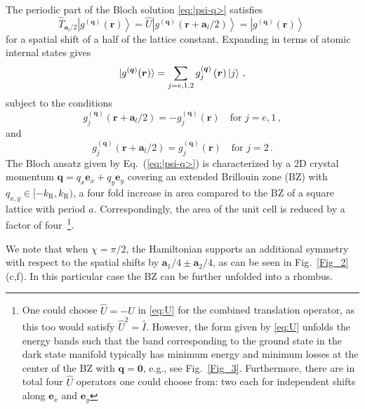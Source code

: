 \documentclass[aps,pra,twocolumn,showpacs,superscriptaddress,floatfix,longbibliography]{revtex4-1}
\def\kr{k_{\mathrm R}}                            			%
\def\ex{\boldsymbol{e}_x}
\def\ey{\boldsymbol{e}_y}
\begin{document}
The periodic part of the Bloch solution \eqref{eq:|psi-q>} satisfies
%
\begin{equation}
\hat{T}_{\mathbf{a}_l /2} \left|g^{(\boldsymbol{q})}(\boldsymbol{r})\right\rangle =\hat{U}\left|g^{(\boldsymbol{q})}(\boldsymbol{r}+\mathbf{a}_l / 2)\right\rangle =\left|g^{(\boldsymbol{q})}(\boldsymbol{r})\right\rangle \,\label{eq:U-g-q-eigenvalue}
\end{equation}
for a spatial shift of a half of the lattice constant.
Expanding in terms of atomic internal states gives
\begin{equation}
|g^{(\boldsymbol{q})}(\boldsymbol{r})\rangle=\sum_{j=e,1,2} g_{j}^{(\boldsymbol{q})}\left(\boldsymbol{r}\right)\ket{j}\,,\label{eq:|g^q>-expansion}
\end{equation}
%
subject to the conditions
%
\begin{equation}
g_{j}^{(\boldsymbol{q})}(\boldsymbol{r}+\mathbf{a}_l / 2)=-g_j^{(\boldsymbol{q})}(\boldsymbol{r}) \quad \mathrm{for}\,\,j=e,1 \, ,
\label{g_restriction_a2_1}
\end{equation}
%
and
%
\begin{equation}
g_{j}^{(\boldsymbol{q})}(\boldsymbol{r}+\mathbf{a}_l / 2)=g_{j}^{(\boldsymbol{q})}(\boldsymbol{r})
\quad \mathrm{for}\,\,j=2\,.
\label{g_restriction_a2_2}
\end{equation}
%
The Bloch ansatz given by Eq.~(\ref{eq:|psi-q>})
is characterized by a 2D crystal momentum $\boldsymbol{q} = q_x \mathbf{e}_x + q_y \mathbf{e}_y$
covering an extended Brillouin zone (BZ) with $q_{x,y} \in [-\kr,\kr)$, a four fold increase in area compared to the BZ of a square lattice with period $a$. 
Correspondingly, the area of the unit cell is reduced by a factor of four~\footnote{One could choose $\hat{U}=-\hat{U}$ in \eqref{eq:U} for the combined translation operator, as this too would satisfy $\hat{U}^{2}=\hat{I}$. However, the form given by \eqref{eq:U} unfolds the energy bands such that the band corresponding to the ground state in the dark state manifold typically has minimum energy and minimum losses at the center of the BZ with $\boldsymbol{q}=\mathbf{0}$, e.g., see Fig.~\ref{Fig_3}. Furthermore, there are in total four $\hat{U}$ operators one could choose from: two each for independent shifts along $\ex$ and $\ey$}.

We note that when $\chi = \pi/2$, the Hamiltonian supports an additional symmetry with respect to the spatial shifts by $\mathbf{a}_1/4 \pm \mathbf{a}_2/4$, as can be seen in Fig.~\ref{Fig_2}(c,f).
In this particular case the BZ can be further unfolded into a rhombus.
\end{document}
